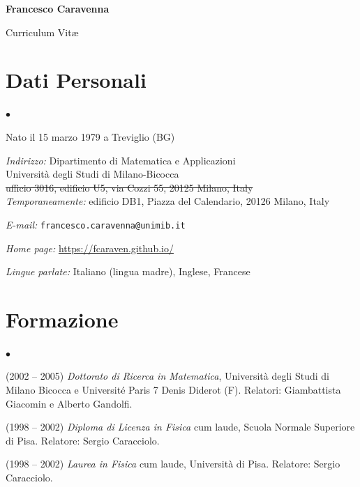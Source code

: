 \documentclass[a4paper,11pt,oneside]{amsart}
\newenvironment{myitemize}{%
\begin{list}{$\bullet$}%
 	{%
	\setlength{\itemsep}{0.3em}%
	\setlength{\topsep}{0.3em}%
	\setlength{\partopsep}{0em}%
	\setlength{\parsep}{0em}%
	\setlength{\parskip}{0em}%
	\setlength\leftmargin{1.5em}%
	\setlength\labelwidth{1.1em}%
	\setlength{\labelsep}{0.4em}%
	}%
	}%
{\end{list}}
\renewenvironment{itemize}{
\begin{myitemize}}%
{\end{myitemize}}
\begin{document}
\LARGE
{\huge\sffamily\bfseries Francesco Caravenna}\hfill 
{\normalsize\sffamily {}}

{\sffamily Curriculum Vit\ae}

\vspace{1.5ex}

\normalsize

\section{Dati Personali}

\begin{itemize}

\item Nato il 15 marzo 1979 a Treviglio (BG)

\item \emph{Indirizzo:} Dipartimento di Matematica e Applicazioni\\
 Università degli Studi di Milano-Bicocca\\
 \sout{{\color{gray}ufficio 3016, edificio U5, via Cozzi 55, 20125 Milano, Italy}}\\
 \emph{Temporaneamente:} edificio DB1, Piazza del Calendario, 
20126 Milano, Italy

\item \textit{E-mail:} \texttt{francesco.caravenna@unimib.it}

\item \textit{Home page:} \url{https://fcaraven.github.io/}

\item \textit{Lingue parlate:} Italiano (lingua madre), Inglese, Francese


\end{itemize}
 

\section{Formazione}

\begin{itemize}
\item
(2002 -- 2005) \textit{Dottorato di Ricerca in Matematica},
Università degli Studi di Milano Bicocca 
e Université Paris 7 Denis Diderot (F). Relatori:
Giambattista Giacomin e Alberto Gandolfi.

\item
(1998 -- 2002)
\textit{Diploma di Licenza in Fisica} cum laude, %
Scuola Normale Superiore di Pisa. Relatore: Sergio Caracciolo.

\item
(1998 -- 2002)
\textit{Laurea in Fisica} cum laude, %
Università di Pisa. Relatore: Sergio Caracciolo.
\end{itemize}
\end{document}
